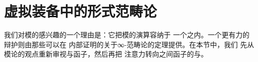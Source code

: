 \providecommand{\HomA}{\mathrm{Hom}_{A}}
\providecommand{\HomB}{\mathrm{Hom}_{B}}
\providecommand{\HomC}{\mathrm{Hom}_{C}}
\providecommand{\HomOne}{\mathrm{Hom}_{1}}
\providecommand{\HomJ}{\mathrm{Hom}_{J}}
\providecommand{\colim}{\mathop{\mathrm{colim}}}
\providecommand{\qcTwo}{\mathbf{2}}

\section{虚拟装备中的形式范畴论}\label{sec:formal-category-theory-in-a-virtual-equipment}

我们对模的\trVirtualEquipment{}感兴趣的一个理由是：它把模的演算容纳于
一个\trInfinityCosmos{}之内。一个更有力的辩护则由那些可以在%
\trVirtualEquipment{}内部证明的关于∞-范畴论的定理提供。在本节中，我们
先从模论的观点重新审视\trAdjunction{}与\trFullyFaithful{}函子，然后再把
注意力转向\trInfinityCategory{}之间函子的\trLimit{}与\trColimit。

